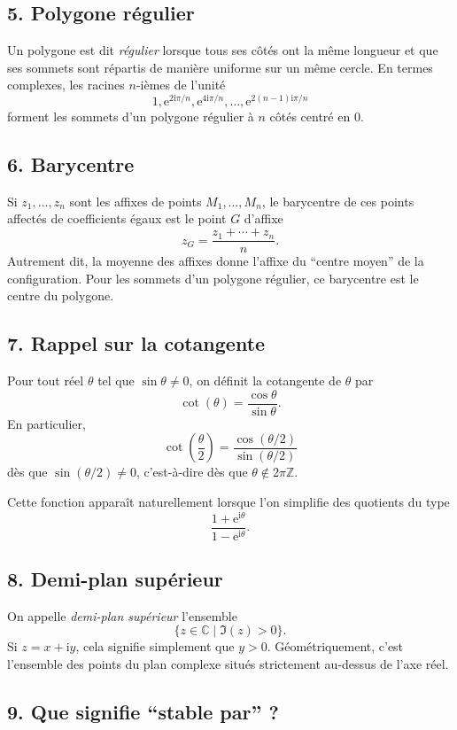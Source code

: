 \documentclass[11pt,a4paper]{article}
\newcommand{\C}{\mathbb{C}}
\newcommand{\ii}{\mathrm{i}}
\newcommand{\e}{\mathrm{e}}
\begin{document}
\subsection*{5. Polygone régulier}

Un polygone est dit \emph{régulier} lorsque tous ses côtés ont la même longueur et que ses sommets sont répartis de manière uniforme sur un même cercle. En termes complexes, les racines \(n\)-ièmes de l'unité
\[
1,\e^{2\ii\pi/n},\e^{4\ii\pi/n},\dots,\e^{2(n-1)\ii\pi/n}
\]
forment les sommets d'un polygone régulier à \(n\) côtés centré en \(0\).

\subsection*{6. Barycentre}

Si \(z_1,\dots,z_n\) sont les affixes de points \(M_1,\dots,M_n\), le barycentre de ces points affectés de coefficients égaux est le point \(G\) d'affixe
\[
z_G=\frac{z_1+\cdots+z_n}{n}.
\]
Autrement dit, la moyenne des affixes donne l'affixe du ``centre moyen'' de la configuration.
Pour les sommets d'un polygone régulier, ce barycentre est le centre du polygone.

\subsection*{7. Rappel sur la cotangente}

Pour tout réel \(\theta\) tel que \(\sin\theta\neq 0\), on définit la cotangente de \(\theta\) par
\[
\cot(\theta)=\frac{\cos\theta}{\sin\theta}.
\]
En particulier,
\[
\cot\!\left(\frac{\theta}{2}\right)=\frac{\cos(\theta/2)}{\sin(\theta/2)}
\]
dès que \(\sin(\theta/2)\neq 0\), c'est-à-dire dès que \(\theta\notin 2\pi\mathbb{Z}\).

Cette fonction apparaît naturellement lorsque l'on simplifie des quotients du type
\[
\frac{1+\e^{\ii\theta}}{1-\e^{\ii\theta}}.
\]
\subsection*{8. Demi-plan supérieur}

On appelle \emph{demi-plan supérieur} l'ensemble
\[
\{z\in\C\mid \Im(z)>0\}.
\]
Si \(z=x+\ii y\), cela signifie simplement que \(y>0\).
Géométriquement, c'est l'ensemble des points du plan complexe situés strictement au-dessus de l'axe réel.

\subsection*{9. Que signifie ``stable par'' ?}
\end{document}

